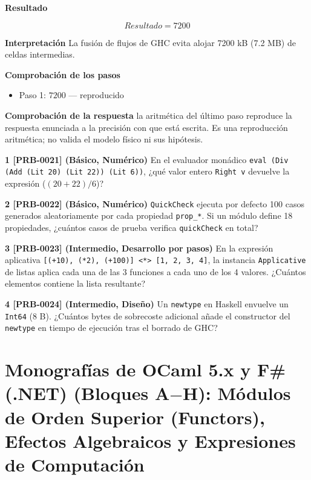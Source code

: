 \documentclass{book}
\begin{document}
\begin{tcolorbox}[title={Problema resuelto}, studiumworked, breakable]
\noindent\textbf{Resultado}

\[
Resultado = 7200
\]

\noindent\textbf{Interpretación}
La fusión de flujos de GHC evita alojar 7200 kB (7.2 MB) de celdas intermedias.

\noindent\textbf{Comprobación de los pasos}
\begin{itemize}
\item Paso 1: $7200$ — reproducido
\end{itemize}

\noindent\textbf{Comprobación de la respuesta} la aritmética del último paso reproduce la respuesta enunciada a la precisión con que está escrita. Es una reproducción aritmética; no valida el modelo físico ni sus hipótesis.
\end{tcolorbox}

\begin{tcolorbox}[title={Ejercicios}, studiumworked, breakable]

\noindent\textbf{1 [PRB-0021] (Básico, Numérico)}
En el evaluador monádico \texttt{eval (Div (Add (Lit 20) (Lit 22)) (Lit 6))}, ¿qué valor entero \texttt{Right v} devuelve la expresión (\((20 + 22) / 6\))?

\noindent\textbf{2 [PRB-0022] (Básico, Numérico)}
\texttt{QuickCheck} ejecuta por defecto 100 casos generados aleatoriamente por cada propiedad \texttt{prop\_*}. Si un módulo define 18 propiedades, ¿cuántos casos de prueba verifica \texttt{quickCheck} en total?

\noindent\textbf{3 [PRB-0023] (Intermedio, Desarrollo por pasos)}
En la expresión aplicativa \texttt{[(+10), (*2), (+100)] <*> [1, 2, 3, 4]}, la instancia \texttt{Applicative} de listas aplica cada una de las 3 funciones a cada uno de los 4 valores. ¿Cuántos elementos contiene la lista resultante?

\noindent\textbf{4 [PRB-0024] (Intermedio, Diseño)}
Un \texttt{newtype} en Haskell envuelve un \texttt{Int64} (8 B). ¿Cuántos bytes de sobrecoste adicional añade el constructor del \texttt{newtype} en tiempo de ejecución tras el borrado de GHC?
\end{tcolorbox}

\chapter{Monografías de OCaml 5.x y F\# (.NET) (Bloques A\(-\)H): Módulos de Orden Superior (Functors), Efectos Algebraicos y Expresiones de Computación}
\label{chap:cap05-monografias-ocaml-fsharp-ml-sistemas-tipos}
\end{document}
